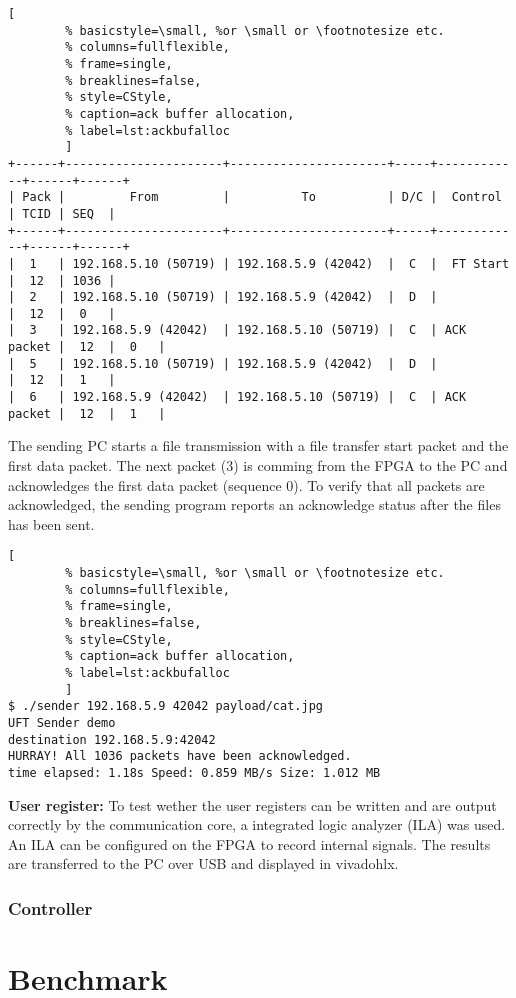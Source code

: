     \begin{adjustbox}{max width=1.7\textwidth}
\begin{minipage}{2\linewidth}
    \begin{lstlisting}[
        % basicstyle=\small, %or \small or \footnotesize etc.
        % columns=fullflexible,
        % frame=single,
        % breaklines=false,
        % style=CStyle, 
        % caption=ack buffer allocation, 
        % label=lst:ackbufalloc
        ]
+------+----------------------+----------------------+-----+------------+------+------+
| Pack |         From         |          To          | D/C |  Control   | TCID | SEQ  | 
+------+----------------------+----------------------+-----+------------+------+------+
|  1   | 192.168.5.10 (50719) | 192.168.5.9 (42042)  |  C  |  FT Start  |  12  | 1036 |
|  2   | 192.168.5.10 (50719) | 192.168.5.9 (42042)  |  D  |            |  12  |  0   |
|  3   | 192.168.5.9 (42042)  | 192.168.5.10 (50719) |  C  | ACK packet |  12  |  0   |
|  5   | 192.168.5.10 (50719) | 192.168.5.9 (42042)  |  D  |            |  12  |  1   |
|  6   | 192.168.5.9 (42042)  | 192.168.5.10 (50719) |  C  | ACK packet |  12  |  1   |\end{lstlisting}
\end{minipage}
\end{adjustbox}

The sending PC starts a file transmission with a file transfer start packet and
the first data packet. The next packet (3) is comming from the FPGA to the PC
and acknowledges the first data packet (sequence 0). To verify that all packets
are acknowledged, the sending program reports an acknowledge status after the
files has been sent. 

\begin{minipage}{\linewidth}
    \begin{lstlisting}[
        % basicstyle=\small, %or \small or \footnotesize etc.
        % columns=fullflexible,
        % frame=single,
        % breaklines=false,
        % style=CStyle, 
        % caption=ack buffer allocation, 
        % label=lst:ackbufalloc
        ]
$ ./sender 192.168.5.9 42042 payload/cat.jpg
UFT Sender demo
destination 192.168.5.9:42042
HURRAY! All 1036 packets have been acknowledged.
time elapsed: 1.18s Speed: 0.859 MB/s Size: 1.012 MB\end{lstlisting}
\end{minipage}

\vspace{1ex}
\textbf{User register:} To test wether the user registers can be written and are
output correctly by the communication core, a integrated logic analyzer (ILA)
was used. An ILA can be configured on the FPGA to record internal signals. The
results are transferred to the PC over USB and displayed in \gls{vivadohlx}. 


\subsubsection*{Controller}

%
%
\section{Benchmark}\label{ch:benchmark}

